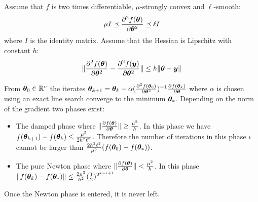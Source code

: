 \begin{proposition}
  \label{eq:conv:newton}
  Assume that $f$ is two times differentiable, $\mu$-strongly convex and $\ell$-smooth:
  \begin{equation}
    \mu I \preceq \partialfrac{\thetab^2}{^2 f(\thetab)} \preceq \ell I
  \end{equation}
  where $I$ is the identity matrix.
  Assume that the Hessian is Lipschitz with constant $h$:
  \begin{equation}
  \| \partialfrac{\thetab^2}{^2 f(\thetab)} - \partialfrac{\thetab^2}{^2 f(\yb)} \| \leq h \| \thetab
  - \yb \|
 \end{equation}

  From $\thetab_0 \in \RR^v$  the iterates
  $\thetab_{k+1} = \thetab_k -\alpha (\partialfrac{\thetab^2}{^2 f(\thetab_0)})^{-1}
  \partialfrac{\thetab}{f(\thetab_k)}$ where $\alpha$ is chosen using an exact line
  search converge to the
  minimum $\thetab_*$.
  Depending on the norm of the gradient two phases exist:
  \begin{itemize}
  \item The damped phase where $\| \partialfrac{\thetab}{f(\thetab)} \| \geq \frac{\mu^2}{h}$.
    In this phase we have $f(\thetab_{k+1}) - f(\thetab_k) \leq \frac{\mu^5}{2h^2 \ell^2}$.
    Therefore the number of iterations in this phase $i$ cannot be larger than
    $\frac{2 h^2 \ell^2}{\mu^5}(f(\thetab_0) - f(\thetab_*))$.
  \item The pure Newton phase where $\| \partialfrac{\thetab}{f(\thetab)} \| < \frac{\mu^2}{h}$.
      In this phase $\|f(\thetab_{k}) - f(\thetab_*)\| \leq \frac{2 \mu^3}{h^2}
      (\frac12)^{2^{k -i +1}}$
 \end{itemize}
 Once the Newton phase is entered, it is never left.
\end{proposition}
